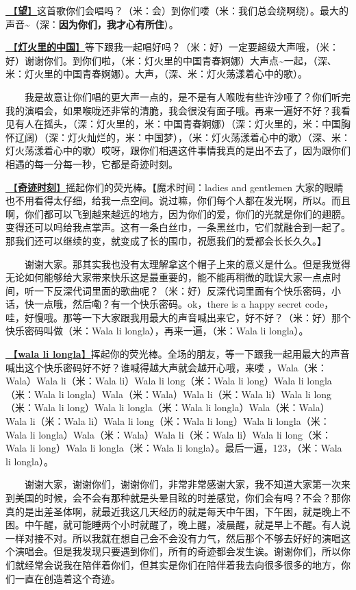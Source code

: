 \documentclass[]{ctexbook}
\begin{document}
\hyperref[Gaze]{🎵【\textbf{望}】}这首歌你们会唱吗？（米：会）到你们喽（米：我们总会绕啊绕）。最大的声音\textasciitilde（深：\textbf{因为你们，我才心有所住}）。

\hyperref[China-in-the-lights]{🎵【\textbf{灯火里的中国}】}等下跟我一起唱好吗？（米：好）一定要超级大声哦，（米：好）谢谢你们。到你们啦，（米：灯火里的中国青春婀娜）大声点\textasciitilde 一起，（深、米：灯火里的中国青春婀娜）。大声，（深、米：灯火荡漾着心中的歌）。

  我是故意让你们唱的更大声一点的，是不是有人喉咙有些许沙哑了？你们听完我的演唱会，如果喉咙还非常的清脆，我会很没有面子哦。再来一遍好不好？我看见有人在摇头，（深：灯火里的，米：中国青春婀娜）（深：灯火里的，米：中国胸怀辽阔）（深：灯火灿烂的，米：中国梦），（米：灯火荡漾着心中的歌）（深、米：灯火荡漾着心中的歌）哎呀，跟你们相遇这件事情我真的是出不去了，因为跟你们相遇的每一分每一秒，它都是奇迹时刻。

\hyperref[magic-moment]{🎵【\textbf{奇迹时刻}】}摇起你们的荧光棒。【魔术时间：ladies and gentlemen 大家的眼睛也不用看得太仔细，给我一点空间。说过嘛，你们每个人都在发光啊，所以。而且啊，你们都可以飞到越来越远的地方，因为你们的爱，你们的光就是你们的翅膀。变得还可以吗给我点掌声。这有一条白丝巾，一条黑丝巾，它们就融合到一起了。那我们还可以继续的变，就变成了长的围巾，祝愿我们的爱都会长长久久。】

  谢谢大家。那其实我也没有太理解拿这个帽子上来的意义是什么。但是我觉得无论如何能够给大家带来快乐这是最重要的，能不能再稍微的耽误大家一点点时间，听一下反深代词里面的歌曲呢？（米：好）反深代词里面有个快乐密码，小话，快一点哦，然后嘞？有一个快乐密码。ok，there is a happy secret code， 哇，好慢哦。那等一下大家跟我用最大的声音喊出来它，好不好？（米：好）那个快乐密码叫做（米：Wala li longla），再来一遍，（米：Wala li longla）。

\hyperref[wala-li-longla]{🎵【\textbf{wala li longla}】}挥起你的荧光棒。全场的朋友，等一下跟我一起用最大的声音喊出这个快乐密码好不好？谁喊得越大声就会越开心哦，来喽 ，Wala（米：Wala）Wala li（米：Wala li）Wala li long（米：Wala li long）Wala li longla（米：Wala li longla）Wala（米：Wala）Wala li（米：Wala li）Wala li long（米：Wala li long）Wala li longla（米：Wala li longla）Wala（米：Wala）Wala li（米：Wala li）Wala li long（米：Wala li long）Wala li longla（米：Wala li longla）Wala（米：Wala）Wala li（米：Wala li）Wala li long（米：Wala li long）Wala li longla（米：Wala li longla）。最后一遍，123，（米：Wala li longla）。

  谢谢大家，谢谢你们，谢谢你们，非常非常感谢大家，我不知道大家第一次来到美国的时候，会不会有那种就是头晕目眩的时差感觉，你们会有吗？不会？那你真的是出差圣体啊，就最近我这几天经历的就是每天中午困，下午困，就是晚上不困。中午醒，就可能睡两个小时就醒了，晚上醒，凌晨醒，就是早上不醒。有人说一样对接不对。所以我就在想自己会不会没有力气，然后那个不够去好好的演唱这个演唱会。但是我发现只要遇到你们，所有的奇迹都会发生诶。谢谢你们，所以你们就经常会说我在陪伴着你们，但其实是你们在陪伴着我去向很多很多的地方，你们一直在创造着这个奇迹。
\end{document}
